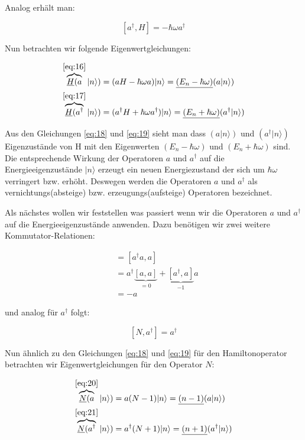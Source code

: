 Analog erhält man:

\begin{equation}
  \label{eq:17}
  [a^\dagger,H] = -\hbar\omega a^\dagger
\end{equation}

Nun betrachten wir folgende Eigenwertgleichungen:

\begin{align}
 \overbrace{\underline{H}(a}^{\eqref{eq:16}}|n\rangle ) &= (aH-\hbar\omega a)|n\rangle  = \underline{(E_n-\hbar\omega)}(a|n\rangle ) \label{eq:18}\\
  \overbrace{\underline{H}(a^\dagger}^{\eqref{eq:17}}|n\rangle ) &= (a^\dagger H+\hbar\omega a^\dagger)|n\rangle  = \underline{(E_n+\hbar\omega)}(a^\dagger|n\rangle )\label{eq:19}
\end{align}



Aus den Gleichungen \eqref{eq:18} und \eqref{eq:19} sieht man dass \((a|n\rangle) \) und \((a^\dagger|n\rangle)\) Eigenzustände von H mit den Eigenwerten \((E_n-\hbar\omega)\) und  \((E_n+ \hbar\omega)\) sind. Die entsprechende Wirkung der Operatoren \(a\) und \(a^\dagger\) auf die Energieeigenzustände \(|n\rangle \) erzeugt ein neuen Energiezustand der sich um \(\hbar\omega\) verringert bzw. erhöht. Deswegen werden die Operatoren \(a\) und \(a^\dagger\) als vernichtungs(absteige) bzw. erzeugungs(aufsteige) Operatoren bezeichnet. 

Als nächstes wollen wir feststellen was passiert wenn wir die Operatoren \(a\) und \(a^\dagger\) auf die Energieeigenzustände anwenden. Dazu benötigen wir zwei weitere Kommutator-Relationen:

\begin{align}
  [N,a] &= [a^\dagger a,a] \\
&= a^\dagger\underbrace{[a,a]}_{=0} + \underbrace{[a^\dagger,a]}_{-1}a \\
&= - a\label{eq:20}
\end{align}

und analog für \(a^\dagger\) folgt:

\begin{equation}
  \label{eq:21}
  [N,a^\dagger] = a^\dagger
\end{equation}

Nun ähnlich zu den Gleichungen \eqref{eq:18} und \eqref{eq:19} für den Hamiltonoperator betrachten wir  Eigenwertgleichungen für den Operator \(N\):


\begin{align}
 \overbrace{\underline{N}(a}^{\eqref{eq:20}}|n\rangle ) &= a(N-1)|n\rangle  = \underline{(n-1)}(a|n\rangle ) \label{eq:22}\\
  \overbrace{\underline{N}(a^\dagger}^{\eqref{eq:21}}|n\rangle ) &= a^\dagger(N+1)|n\rangle  = \underline{(n+1)}(a^\dagger|n\rangle )\label{eq:23}
\end{align}

